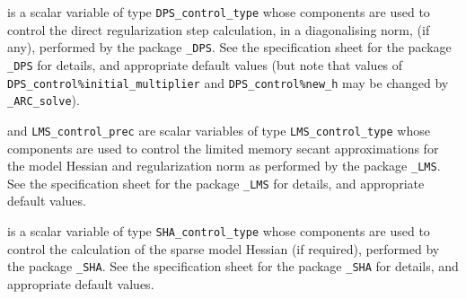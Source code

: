 \documentclass{galahad}
\newcommand{\packagename}{ARC}
\newcommand{\fullpackagename}{\libraryname\_\packagename}
\newcommand{\solver}{{\tt \fullpackagename\_solve}}
\begin{document}
\begin{description}
 is a scalar variable of type
{\tt DPS\_control\_type}
whose components are used to control the
direct regularization step calculation, in a diagonalising norm, (if any),
performed by the package
{\tt \libraryname\_DPS}.
See the specification sheet for the package
{\tt \libraryname\_DPS}
for details, and appropriate default values
(but note that values of
{\tt DPS\_control\%initial\_multiplier}
and
{\tt DPS\_control\%new\_h}
may be changed by \solver).

 and {\tt LMS\_control\_prec}
are scalar variables of type
{\tt LMS\_control\_type}
whose components are used to control the limited memory secant
approximations for the model Hessian and regularization norm as
performed by the package
{\tt \libraryname\_LMS}.
See the specification sheet for the package
{\tt \libraryname\_LMS}
for details, and appropriate default values.

 is a scalar variable of type
{\tt SHA\_control\_type}
whose components are used to control the
calculation of the sparse model Hessian (if required),
performed by the package
{\tt \libraryname\_SHA}.
See the specification sheet for the package
{\tt \libraryname\_SHA}
for details, and appropriate default values.

\end{description}

\end{document}
